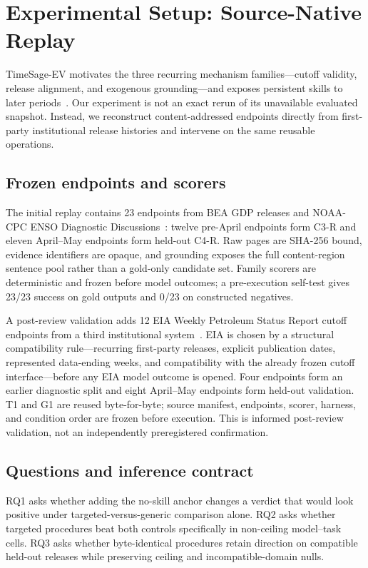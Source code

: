\section{Experimental Setup: Source-Native Replay}
\label{sec:evidence}
TimeSage-EV motivates the three recurring mechanism families---cutoff validity, release alignment, and exogenous grounding---and exposes persistent skills to later periods~\citep{yao2026timesage}. Our experiment is not an exact rerun of its unavailable evaluated snapshot. Instead, we reconstruct content-addressed endpoints directly from first-party institutional release histories and intervene on the same reusable operations.

\subsection{Frozen endpoints and scorers}
The initial replay contains 23 endpoints from BEA GDP releases and NOAA-CPC ENSO Diagnostic Discussions~\citep{bea2026archive,noaa2026enso}: twelve pre-April endpoints form C3-R and eleven April--May endpoints form held-out C4-R. Raw pages are SHA-256 bound, evidence identifiers are opaque, and grounding exposes the full content-region sentence pool rather than a gold-only candidate set. Family scorers are deterministic and frozen before model outcomes; a pre-execution self-test gives 23/23 success on gold outputs and 0/23 on constructed negatives.

A post-review validation adds 12 EIA Weekly Petroleum Status Report cutoff endpoints from a third institutional system~\citep{eia2026wpsrarchive}. EIA is chosen by a structural compatibility rule---recurring first-party releases, explicit publication dates, represented data-ending weeks, and compatibility with the already frozen cutoff interface---before any EIA model outcome is opened. Four endpoints form an earlier diagnostic split and eight April--May endpoints form held-out validation. T1 and G1 are reused byte-for-byte; source manifest, endpoints, scorer, harness, and condition order are frozen before execution. This is informed post-review validation, not an independently preregistered confirmation.

\subsection{Questions and inference contract}
RQ1 asks whether adding the no-skill anchor changes a verdict that would look positive under targeted-versus-generic comparison alone. RQ2 asks whether targeted procedures beat both controls specifically in non-ceiling model--task cells. RQ3 asks whether byte-identical procedures retain direction on compatible held-out releases while preserving ceiling and incompatible-domain nulls.

